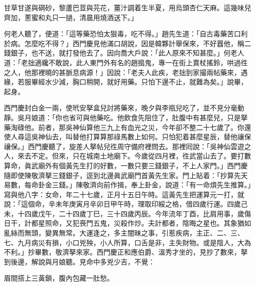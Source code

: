 \begin{myquote}
甘草甘遂與碙砂，黎蘆巴荳與芫花，薑汁調着生半夏，用烏頭杏仁天麻。這幾味兒齊加，蔥蜜和丸只一撾，清晨用燒酒送下。」
\end{myquote}

何老人聽了，便道：「這等藥恐怕太狠毒，吃不得。」趙先生道：「自古毒藥苦口利於病。怎麼吃不得？」西門慶見他滿口胡說，因是韓夥計舉保來，不好囂他，稱二錢銀子，也不送，就打發他去了。因向喬大戶說：「此人原來不知甚麼。」何老人道：「老拙適纔不敢說，此人東門外有名的趙搗鬼，專一在街上賣杖搖鈴，哄過徃之人，他那裡曉的甚脈息病源！」因說：「老夫人此疾，老拙到家撮兩帖藥來，遇緣，若服畢經水少減，胸口稍開，就好用藥。只怕下邊不止，就難為矣。」說畢，起身。

西門慶封白金一兩，使玳安拏盒兒討將藥來，晚夕與李瓶兒吃了，並不見分毫動靜。吳月娘道：「你也省可與他藥吃。他飲食先阻住了，肚腹中有甚麼兒，只是拏藥淘碌他。{}前者，那吳神仙算他三九上有血光之災，今年卻不整二十七歲了。你還使人尋這吳神仙去，叫替他打算算那祿馬數上如何。只怕犯着甚麼星辰，替他禳保禳保。」西門慶聽了，旋差人拏帖兒徃周守備府裡問去。那裡囘說：「吳神仙雲遊之人，來去不定。但來，只在城南土地廟下。今歲從四月裡，徃武當山去了。要打數算命，眞武廟外有個黃先生打的好數，一數只要三錢銀子，不上人家門。」西門慶隨即使陳敬濟拏三錢銀子，逕到北邊眞武廟門首黃先生家。{}門上貼着：「抄算先天易數，每命卦金三錢。」陳敬濟向前作揖，奉上卦金，說道：「有一命煩先生推算。」寫與他八字：女命，年二十七歲，正月十五日午時。這黃先生把運算元一打，就說：「這個命，辛未年庚寅月辛卯日甲午時，理取印綏之格，借四歲行運。四歲己未，十四歲戊午，二十四歲丁巳，三十四歲丙辰。今年流年丁酉，比肩用事，歲傷日干，計都星照命，又犯䘮門五鬼，災殺作炒。夫計都者，陰晦之星也。其象猶如亂絲而無頭，變異無常。大運逢之，多主闇昧之事，引惹疾病，主正、二、三、七、九月病災有損，小口兇殃，小人所算，口舌是非，主失財物。或是陰人，大為不利。」{}抄畢數，敬濟拏來家。西門慶正和應伯爵、溫秀才坐的，見抄了數來，拏到後邊，解說與月娘聽。見命中多兇少吉，不覺：

\begin{myquote}
眉間搭上三黃鎖，腹內包藏一肚愁。
\end{myquote}

